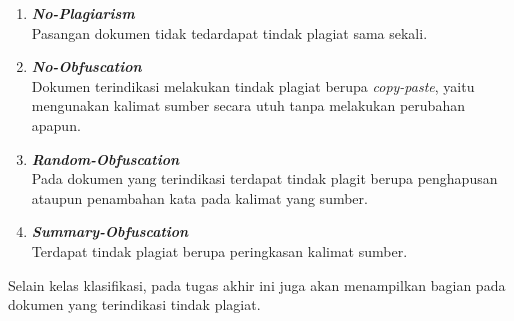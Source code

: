 \documentclass[../Proposal.tex]{subfiles}
\begin{document}
	\begin{enumerate}
		\item \textit{\textbf{No-Plagiarism}} \\
		Pasangan dokumen tidak tedardapat tindak plagiat sama sekali.
		\item \textit{\textbf{No-Obfuscation}} \\
		Dokumen terindikasi melakukan tindak plagiat berupa \textit{copy-paste}, yaitu mengunakan kalimat sumber secara utuh tanpa melakukan perubahan apapun.
		\item \textit{\textbf{Random-Obfuscation}} \\
		Pada dokumen yang terindikasi terdapat tindak plagit berupa penghapusan ataupun penambahan kata pada kalimat yang sumber.
		\item \textit{\textbf{Summary-Obfuscation}} \\
		Terdapat tindak plagiat berupa peringkasan kalimat sumber.
	\end{enumerate}
	
	Selain kelas klasifikasi, pada tugas akhir ini juga akan menampilkan bagian pada dokumen yang terindikasi tindak plagiat.
\end{document}
